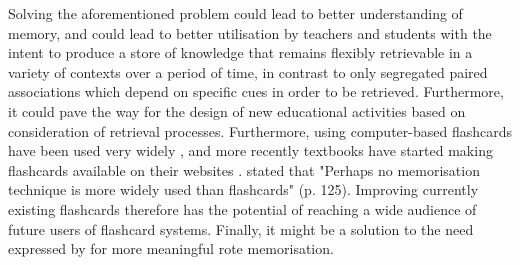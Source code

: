 
Solving the aforementioned problem could lead to better understanding of memory, and could lead to better utilisation by teachers and students with the intent to produce a store of knowledge that remains flexibly retrievable in a variety of contexts over a period of time, in contrast to only segregated paired associations which depend on specific cues in order to be retrieved. Furthermore, it could pave the way for the design of new educational activities based on consideration of retrieval processes. Furthermore, using computer-based flashcards have been used very widely \cite{nakata}, and more recently textbooks have started making flashcards available on their websites \cite{burgess, golding}.  stated that "Perhaps no memorisation technique is more widely used than flashcards" (p. 125). Improving currently existing flashcards therefore has the potential of reaching a wide audience of future users of flashcard systems. Finally, it might be a solution to the need expressed by  for more meaningful rote memorisation.





